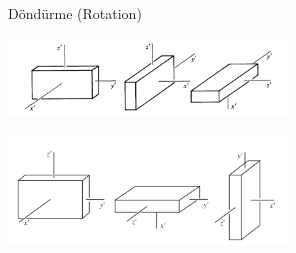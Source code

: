 \documentclass[12pt,fleqn]{article}\usepackage{../../common}
\begin{document}
Döndürme (Rotation)

\includegraphics[width=20em]{phy_072_rot_01.png}

\includegraphics[width=20em]{phy_072_rot_02.png}
\end{document}
